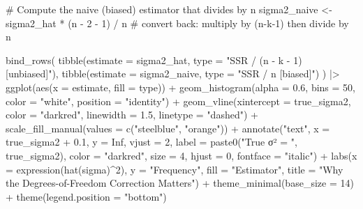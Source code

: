 \documentclass[
  letterpaper,
  DIV=11,
  numbers=noendperiod]{scrreprt}
\newenvironment{Shaded}{\begin{snugshade}}{\end{snugshade}}
\newcommand{\AttributeTok}[1]{\textcolor[rgb]{0.40,0.45,0.13}{#1}}
\newcommand{\CommentTok}[1]{\textcolor[rgb]{0.37,0.37,0.37}{#1}}
\newcommand{\ConstantTok}[1]{\textcolor[rgb]{0.56,0.35,0.01}{#1}}
\newcommand{\DecValTok}[1]{\textcolor[rgb]{0.68,0.00,0.00}{#1}}
\newcommand{\FloatTok}[1]{\textcolor[rgb]{0.68,0.00,0.00}{#1}}
\newcommand{\FunctionTok}[1]{\textcolor[rgb]{0.28,0.35,0.67}{#1}}
\newcommand{\NormalTok}[1]{\textcolor[rgb]{0.00,0.23,0.31}{#1}}
\newcommand{\OtherTok}[1]{\textcolor[rgb]{0.00,0.23,0.31}{#1}}
\newcommand{\SpecialCharTok}[1]{\textcolor[rgb]{0.37,0.37,0.37}{#1}}
\newcommand{\StringTok}[1]{\textcolor[rgb]{0.13,0.47,0.30}{#1}}
\begin{document}
\begin{Shaded}
\begin{Highlighting}[]
\CommentTok{\# Compute the naive (biased) estimator that divides by n}
\NormalTok{sigma2\_naive }\OtherTok{\textless{}{-}}\NormalTok{ sigma2\_hat }\SpecialCharTok{*}\NormalTok{ (n }\SpecialCharTok{{-}} \DecValTok{2} \SpecialCharTok{{-}} \DecValTok{1}\NormalTok{) }\SpecialCharTok{/}\NormalTok{ n  }\CommentTok{\# convert back: multiply by (n{-}k{-}1) then divide by n}

\FunctionTok{bind\_rows}\NormalTok{(}
  \FunctionTok{tibble}\NormalTok{(}\AttributeTok{estimate =}\NormalTok{ sigma2\_hat, }\AttributeTok{type =} \StringTok{"SSR / (n {-} k {-} 1)  [unbiased]"}\NormalTok{),}
  \FunctionTok{tibble}\NormalTok{(}\AttributeTok{estimate =}\NormalTok{ sigma2\_naive, }\AttributeTok{type =} \StringTok{"SSR / n  [biased]"}\NormalTok{)}
\NormalTok{) }\SpecialCharTok{|\textgreater{}}
  \FunctionTok{ggplot}\NormalTok{(}\FunctionTok{aes}\NormalTok{(}\AttributeTok{x =}\NormalTok{ estimate, }\AttributeTok{fill =}\NormalTok{ type)) }\SpecialCharTok{+}
  \FunctionTok{geom\_histogram}\NormalTok{(}\AttributeTok{alpha =} \FloatTok{0.6}\NormalTok{, }\AttributeTok{bins =} \DecValTok{50}\NormalTok{, }\AttributeTok{color =} \StringTok{"white"}\NormalTok{, }\AttributeTok{position =} \StringTok{"identity"}\NormalTok{) }\SpecialCharTok{+}
  \FunctionTok{geom\_vline}\NormalTok{(}\AttributeTok{xintercept =}\NormalTok{ true\_sigma2, }\AttributeTok{color =} \StringTok{"darkred"}\NormalTok{, }\AttributeTok{linewidth =} \FloatTok{1.5}\NormalTok{, }\AttributeTok{linetype =} \StringTok{"dashed"}\NormalTok{) }\SpecialCharTok{+}
  \FunctionTok{scale\_fill\_manual}\NormalTok{(}\AttributeTok{values =} \FunctionTok{c}\NormalTok{(}\StringTok{"steelblue"}\NormalTok{, }\StringTok{"orange"}\NormalTok{)) }\SpecialCharTok{+}
  \FunctionTok{annotate}\NormalTok{(}\StringTok{"text"}\NormalTok{, }\AttributeTok{x =}\NormalTok{ true\_sigma2 }\SpecialCharTok{+} \FloatTok{0.1}\NormalTok{, }\AttributeTok{y =} \ConstantTok{Inf}\NormalTok{, }\AttributeTok{vjust =} \DecValTok{2}\NormalTok{,}
           \AttributeTok{label =} \FunctionTok{paste0}\NormalTok{(}\StringTok{"True σ² = "}\NormalTok{, true\_sigma2),}
           \AttributeTok{color =} \StringTok{"darkred"}\NormalTok{, }\AttributeTok{size =} \DecValTok{4}\NormalTok{, }\AttributeTok{hjust =} \DecValTok{0}\NormalTok{, }\AttributeTok{fontface =} \StringTok{"italic"}\NormalTok{) }\SpecialCharTok{+}
  \FunctionTok{labs}\NormalTok{(}\AttributeTok{x =} \FunctionTok{expression}\NormalTok{(}\FunctionTok{hat}\NormalTok{(sigma)}\SpecialCharTok{\^{}}\DecValTok{2}\NormalTok{),}
       \AttributeTok{y =} \StringTok{"Frequency"}\NormalTok{,}
       \AttributeTok{fill =} \StringTok{"Estimator"}\NormalTok{,}
       \AttributeTok{title =} \StringTok{"Why the Degrees{-}of{-}Freedom Correction Matters"}\NormalTok{) }\SpecialCharTok{+}
  \FunctionTok{theme\_minimal}\NormalTok{(}\AttributeTok{base\_size =} \DecValTok{14}\NormalTok{) }\SpecialCharTok{+}
  \FunctionTok{theme}\NormalTok{(}\AttributeTok{legend.position =} \StringTok{"bottom"}\NormalTok{)}
\end{Highlighting}
\end{Shaded}
\end{document}
